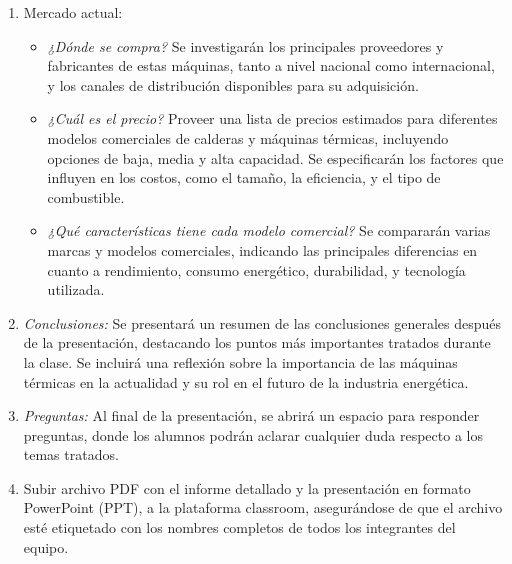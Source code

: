 \documentclass[../main]{subfiles}
\begin{document}
\begin{enumerate}
    \item Mercado actual:
    \begin{itemize}
        \item \emph{¿Dónde se compra?} Se investigarán los principales proveedores y fabricantes de estas máquinas, tanto a nivel nacional como internacional, y los canales de distribución disponibles para su adquisición.
        \item \emph{¿Cuál es el precio?} Proveer una lista de precios estimados para diferentes modelos comerciales de calderas y máquinas térmicas, incluyendo opciones de baja, media y alta capacidad. Se especificarán los factores que influyen en los costos, como el tamaño, la eficiencia, y el tipo de combustible.
        \item \emph{¿Qué características tiene cada modelo comercial?} Se compararán varias marcas y modelos comerciales, indicando las principales diferencias en cuanto a rendimiento, consumo energético, durabilidad, y tecnología utilizada.
    \end{itemize}
    \item \emph{Conclusiones:} Se presentará un resumen de las conclusiones generales después de la presentación, destacando los puntos más importantes tratados durante la clase. Se incluirá una reflexión sobre la importancia de las máquinas térmicas en la actualidad y su rol en el futuro de la industria energética.
    \item \emph{Preguntas:} Al final de la presentación, se abrirá un espacio para responder preguntas, donde los alumnos podrán aclarar cualquier duda respecto a los temas tratados.
    \item Subir archivo PDF con el informe detallado y la presentación en formato PowerPoint (PPT), a la plataforma classroom, asegurándose de que el archivo esté etiquetado con los nombres completos de todos los integrantes del equipo.
\end{enumerate}
\end{document}
